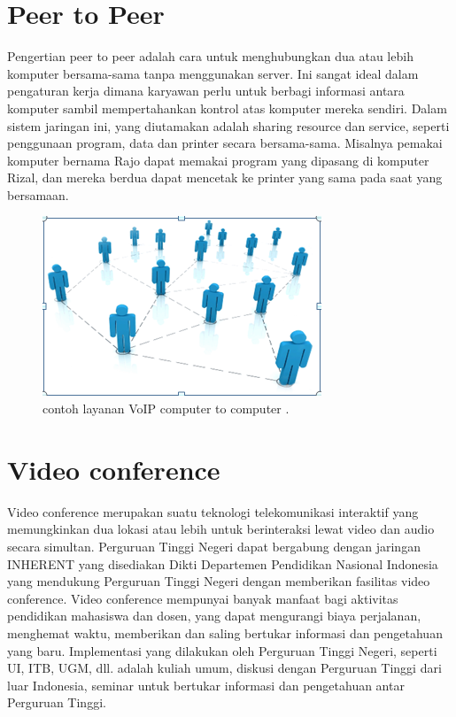 \documentclass{jtetiproposalskripsi}
\begin{document}
\section{Peer to Peer}
Pengertian peer to peer adalah cara untuk menghubungkan dua atau lebih komputer bersama-sama tanpa menggunakan server. Ini sangat ideal dalam pengaturan kerja dimana karyawan perlu untuk berbagi informasi antara komputer sambil mempertahankan kontrol atas komputer mereka sendiri. Dalam sistem jaringan ini, yang diutamakan adalah sharing resource dan service, seperti penggunaan program, data dan printer secara bersama-sama. Misalnya pemakai komputer bernama Rajo dapat memakai program yang dipasang di komputer Rizal, dan mereka berdua dapat mencetak ke printer yang sama pada saat yang bersamaan.

\begin{figure}[ht!]
  \centering
    \includegraphics{gambar/peer1}
    \caption{contoh layanan VoIP computer to computer .}
    \label{wsn}
\end{figure}

\section{Video conference}

Video conference merupakan suatu teknologi telekomunikasi interaktif yang memungkinkan dua lokasi atau lebih untuk berinteraksi lewat video dan audio secara simultan. Perguruan Tinggi Negeri dapat bergabung dengan jaringan INHERENT yang disediakan Dikti Departemen Pendidikan Nasional Indonesia yang mendukung Perguruan Tinggi Negeri dengan memberikan fasilitas video conference. Video conference mempunyai banyak manfaat bagi aktivitas pendidikan mahasiswa dan dosen, yang dapat mengurangi biaya perjalanan, menghemat waktu, memberikan dan saling bertukar informasi dan pengetahuan yang baru. Implementasi yang dilakukan oleh Perguruan Tinggi Negeri, seperti UI, ITB, UGM, dll. adalah kuliah umum, diskusi dengan Perguruan Tinggi dari luar Indonesia, seminar untuk bertukar informasi dan pengetahuan antar Perguruan Tinggi.
\end{document}
